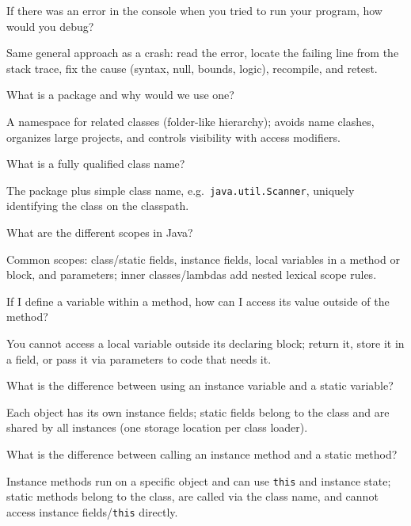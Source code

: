 \newpage

\question[4]
If there was an error in the console when you tried to run your program, how would you debug?
\begin{solutionorbox}[1.35in]
  Same general approach as a crash: read the error, locate the failing line from the stack trace, fix the cause (syntax, null, bounds, logic), recompile, and retest.
\end{solutionorbox}

\question[4]
What is a package and why would we use one?
\begin{solutionorbox}[1.2in]
  A namespace for related classes (folder-like hierarchy); avoids name clashes, organizes large projects, and controls visibility with access modifiers.
\end{solutionorbox}

\question[4]
What is a fully qualified class name?
\begin{solutionorbox}[1.05in]
  The package plus simple class name, e.g.\ \texttt{java.util.Scanner}, uniquely identifying the class on the classpath.
\end{solutionorbox}

\newpage

\question[4]
What are the different scopes in Java?
\begin{solutionorbox}[1.35in]
  Common scopes: class/static fields, instance fields, local variables in a method or block, and parameters; inner classes/lambdas add nested lexical scope rules.
\end{solutionorbox}

\question[4]
If I define a variable within a method, how can I access its value outside of the method?
\begin{solutionorbox}[1.05in]
  You cannot access a local variable outside its declaring block; return it, store it in a field, or pass it via parameters to code that needs it.
\end{solutionorbox}

\question[4]
What is the difference between using an instance variable and a static variable?
\begin{solutionorbox}[1.35in]
  Each object has its own instance fields; static fields belong to the class and are shared by all instances (one storage location per class loader).
\end{solutionorbox}

\newpage

\question[4]
What is the difference between calling an instance method and a static method?
\begin{solutionorbox}[1.35in]
  Instance methods run on a specific object and can use \texttt{this} and instance state; static methods belong to the class, are called via the class name, and cannot access instance fields/\texttt{this} directly.
\end{solutionorbox}

